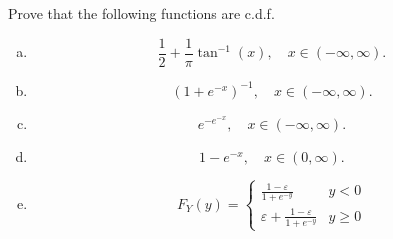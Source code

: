 \documentclass[14pt]{elegantbook}
\begin{document}
    \setcounter{exer}{46}
    \setcounter{chapter}{1}

    \begin{exercise}
        Prove that the following functions are c.d.f. 
        \begin{enumerate}[(a)]
            \item \[\frac{1}{2}+\frac{1}{\pi}\tan^{-1}(x), \quad x\in(-\infty,\infty). \]
            \item \[(1+e^{-x})^{-1}, \quad x\in(-\infty,\infty). \]
            \item \[e^{-e^{-x}}, \quad x\in(-\infty, \infty). \]
            \item \[1-e^{-x}, \quad x\in(0, \infty). \]
            \item \[F_Y(y)=\left\{\begin{matrix}
                \frac{1-\varepsilon}{1+e^{-y}}&y<0\\
                \varepsilon+\frac{1-\varepsilon}{1+e^{-y}}&y\geq0
            \end{matrix}\right.\]
        \end{enumerate} 
    \end{exercise}
\end{document}
